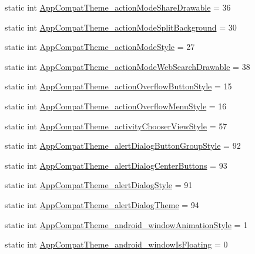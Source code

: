 \begin{DoxyCompactItemize}
static int \hyperlink{classandroid_1_1support_1_1design_1_1R_1_1styleable_a5cc3bc3db3f4a7934ec84ad88a523f1a}{App\+Compat\+Theme\+\_\+action\+Mode\+Share\+Drawable} = 36
\item 
static int \hyperlink{classandroid_1_1support_1_1design_1_1R_1_1styleable_a4b4b91c68eff93edcf95cbb4b498cfeb}{App\+Compat\+Theme\+\_\+action\+Mode\+Split\+Background} = 30
\item 
static int \hyperlink{classandroid_1_1support_1_1design_1_1R_1_1styleable_a6065b230562d4a76f8d2d8990f30a339}{App\+Compat\+Theme\+\_\+action\+Mode\+Style} = 27
\item 
static int \hyperlink{classandroid_1_1support_1_1design_1_1R_1_1styleable_a3150922f00e1e78287f30e03ef037a0a}{App\+Compat\+Theme\+\_\+action\+Mode\+Web\+Search\+Drawable} = 38
\item 
static int \hyperlink{classandroid_1_1support_1_1design_1_1R_1_1styleable_a1a82f2c29c2dd5fb202086c562a387a4}{App\+Compat\+Theme\+\_\+action\+Overflow\+Button\+Style} = 15
\item 
static int \hyperlink{classandroid_1_1support_1_1design_1_1R_1_1styleable_a9665b225f5841e21d3041cc0b4bc2c20}{App\+Compat\+Theme\+\_\+action\+Overflow\+Menu\+Style} = 16
\item 
static int \hyperlink{classandroid_1_1support_1_1design_1_1R_1_1styleable_acf223883bba2bd20dfcd85b3817e5c51}{App\+Compat\+Theme\+\_\+activity\+Chooser\+View\+Style} = 57
\item 
static int \hyperlink{classandroid_1_1support_1_1design_1_1R_1_1styleable_a677c1a9a3b75fec8ef5728a4e4d62af1}{App\+Compat\+Theme\+\_\+alert\+Dialog\+Button\+Group\+Style} = 92
\item 
static int \hyperlink{classandroid_1_1support_1_1design_1_1R_1_1styleable_a80b2dc95b64789c884807b4dcd06b6d0}{App\+Compat\+Theme\+\_\+alert\+Dialog\+Center\+Buttons} = 93
\item 
static int \hyperlink{classandroid_1_1support_1_1design_1_1R_1_1styleable_ac70cd07091cc32fa36cbc2c66306ee94}{App\+Compat\+Theme\+\_\+alert\+Dialog\+Style} = 91
\item 
static int \hyperlink{classandroid_1_1support_1_1design_1_1R_1_1styleable_ab193347a11cc3f92c5815a51c851a4a6}{App\+Compat\+Theme\+\_\+alert\+Dialog\+Theme} = 94
\item 
static int \hyperlink{classandroid_1_1support_1_1design_1_1R_1_1styleable_a6b9a59df5797c2d5c2db14b13076bccd}{App\+Compat\+Theme\+\_\+android\+\_\+window\+Animation\+Style} = 1
\item 
static int \hyperlink{classandroid_1_1support_1_1design_1_1R_1_1styleable_addf459f4095c33a1a44b0cdeea8a72d9}{App\+Compat\+Theme\+\_\+android\+\_\+window\+Is\+Floating} = 0

\end{DoxyCompactItemize}
